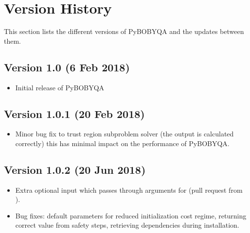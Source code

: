 \documentclass[letterpaper,10pt,english]{sphinxmanual}
\begin{document}
\chapter{Version History}
\label{\detokenize{history:version-history}}\label{\detokenize{history::doc}}
This section lists the different versions of Py\sphinxhyphen{}BOBYQA and the updates between them.


\section{Version 1.0 (6 Feb 2018)}
\label{\detokenize{history:version-1-0-6-feb-2018}}\begin{itemize}
\item {} 
Initial release of Py\sphinxhyphen{}BOBYQA

\end{itemize}


\section{Version 1.0.1 (20 Feb 2018)}
\label{\detokenize{history:version-1-0-1-20-feb-2018}}\begin{itemize}
\item {} 
Minor bug fix to trust region subproblem solver (the output  is calculated correctly) \sphinxhyphen{} this has minimal impact on the performance of Py\sphinxhyphen{}BOBYQA.

\end{itemize}


\section{Version 1.0.2 (20 Jun 2018)}
\label{\detokenize{history:version-1-0-2-20-jun-2018}}\begin{itemize}
\item {} 
Extra optional input  which passes through arguments for  (pull request from ).

\item {} 
Bug fixes: default parameters for reduced initialization cost regime, returning correct value from safety steps, retrieving dependencies during installation.

\end{itemize}
\end{document}
